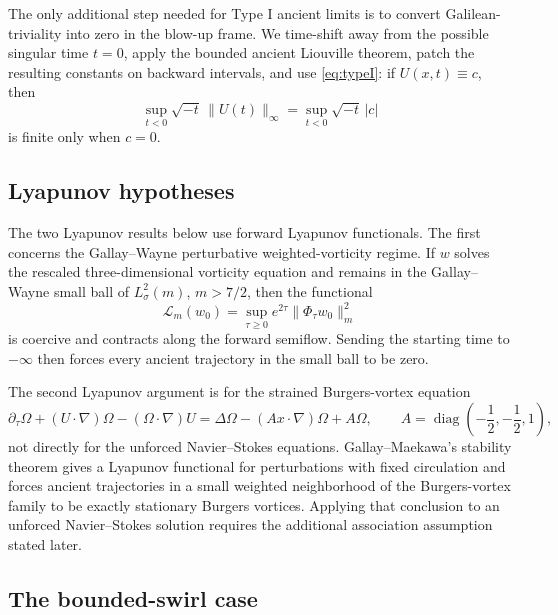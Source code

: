 \documentclass[11pt]{amsart}
\theoremstyle{plain}
\theoremstyle{definition}
\theoremstyle{remark}
\numberwithin{equation}{section}
\begin{document}
The only additional step needed for Type I ancient limits is to convert
Galilean-triviality into zero in the blow-up frame.  We time-shift away from
the possible singular time \(t=0\), apply the bounded ancient Liouville
theorem, patch the resulting constants on backward intervals, and use
\eqref{eq:typeI}: if \(U(x,t)\equiv c\), then
\[
   \sup_{t<0}\sqrt{-t}\,\|U(t)\|_\infty
   =
   \sup_{t<0}\sqrt{-t}\,|c|
\]
is finite only when \(c=0\).

\subsection{Lyapunov hypotheses}

The two Lyapunov results below use forward Lyapunov functionals.  The first
concerns the Gallay--Wayne perturbative weighted-vorticity regime.  If \(w\)
solves the rescaled three-dimensional vorticity equation and remains in the
Gallay--Wayne small ball of \(L^2_\sigma(m)\), \(m>7/2\), then the functional
\begin{equation}\label{eq:intro-weighted-lyap}
   \mathcal L_m(w_0)
   =
   \sup_{\tau\ge0}e^{2\tau}\|\Phi_\tau w_0\|_m^2
\end{equation}
is coercive and contracts along the forward semiflow.  Sending the starting
time to \(-\infty\) then forces every ancient trajectory in the small ball to
be zero.

The second Lyapunov argument is for the strained Burgers-vortex equation
\[
   \partial_\tau\Omega+(U\cdot\nabla)\Omega-(\Omega\cdot\nabla)U
   =
   \Delta\Omega-(Ax\cdot\nabla)\Omega+A\Omega,
   \qquad
   A=\operatorname{diag}\left(-\frac12,-\frac12,1\right),
\]
not directly for the unforced Navier--Stokes equations.  Gallay--Maekawa's
stability theorem gives a Lyapunov functional for perturbations with fixed
circulation and forces ancient trajectories in a small weighted neighborhood
of the Burgers-vortex family to be exactly stationary Burgers vortices.
Applying that conclusion to an unforced Navier--Stokes solution requires the
additional association assumption stated later.

\subsection{The bounded-swirl case}
\end{document}
